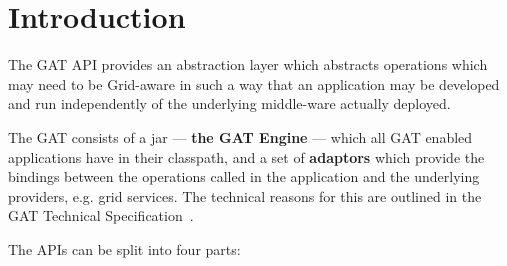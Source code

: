 \documentclass[$Date: 2003/06/26 19:29:31 $]{glabarticle}
\begin{document}


\glablastamendment{\getcvsdate~~--~~\getcvstime} 


\glabmaketitle


\tableofcontents

\newpage


\section{Introduction}

The GAT API provides an abstraction layer which abstracts operations
which may need to be Grid-aware in such a way that an application may
be developed and run independently of the underlying middle-ware
actually deployed.

The GAT consists of a jar --- {\bf the GAT Engine} --- which all GAT enabled
applications have in their classpath, and a set of {\bf adaptors} which
provide the bindings between the operations called in the application and the
underlying providers, e.g. grid services.  The technical reasons for
this are outlined in the GAT Technical Specification~\cite{GridLab-D1.2}.

The APIs can be split into four parts:
\end{document}
